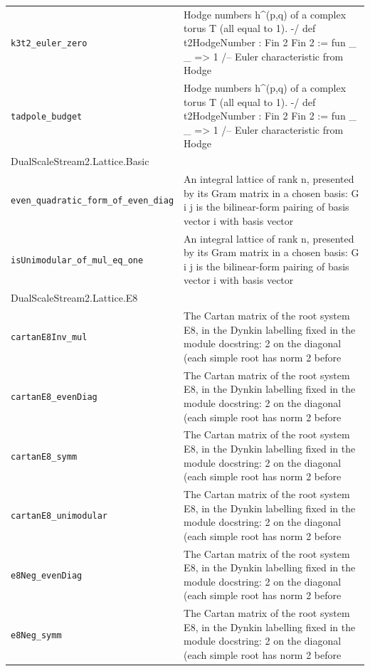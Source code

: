 \begin{longtable}{p{}p{}}
\quad\texttt{\footnotesize k3t2\_euler\_zero} & {\footnotesize Hodge numbers h\^{}(p,q) of a complex torus T (all equal to 1). -/ def t2HodgeNumber : Fin 2  Fin 2   := fun \_ \_ => 1 /-- Euler characteristic from Hodge} \\
\quad\texttt{\footnotesize tadpole\_budget} & {\footnotesize Hodge numbers h\^{}(p,q) of a complex torus T (all equal to 1). -/ def t2HodgeNumber : Fin 2  Fin 2   := fun \_ \_ => 1 /-- Euler characteristic from Hodge} \\
\multicolumn{2}{l}{\textsf{\small DualScaleStream2.Lattice.Basic}} \\
\quad\texttt{\footnotesize even\_quadratic\_form\_of\_even\_diag} & {\footnotesize An integral lattice of rank n, presented by its Gram matrix in a chosen basis: G i j is the bilinear-form pairing of basis vector i with basis vector } \\
\quad\texttt{\footnotesize isUnimodular\_of\_mul\_eq\_one} & {\footnotesize An integral lattice of rank n, presented by its Gram matrix in a chosen basis: G i j is the bilinear-form pairing of basis vector i with basis vector } \\
\multicolumn{2}{l}{\textsf{\small DualScaleStream2.Lattice.E8}} \\
\quad\texttt{\footnotesize cartanE8Inv\_mul} & {\footnotesize The Cartan matrix of the root system E8, in the Dynkin labelling fixed in the module docstring: 2 on the diagonal (each simple root has norm 2 before } \\
\quad\texttt{\footnotesize cartanE8\_evenDiag} & {\footnotesize The Cartan matrix of the root system E8, in the Dynkin labelling fixed in the module docstring: 2 on the diagonal (each simple root has norm 2 before } \\
\quad\texttt{\footnotesize cartanE8\_symm} & {\footnotesize The Cartan matrix of the root system E8, in the Dynkin labelling fixed in the module docstring: 2 on the diagonal (each simple root has norm 2 before } \\
\quad\texttt{\footnotesize cartanE8\_unimodular} & {\footnotesize The Cartan matrix of the root system E8, in the Dynkin labelling fixed in the module docstring: 2 on the diagonal (each simple root has norm 2 before } \\
\quad\texttt{\footnotesize e8Neg\_evenDiag} & {\footnotesize The Cartan matrix of the root system E8, in the Dynkin labelling fixed in the module docstring: 2 on the diagonal (each simple root has norm 2 before } \\
\quad\texttt{\footnotesize e8Neg\_symm} & {\footnotesize The Cartan matrix of the root system E8, in the Dynkin labelling fixed in the module docstring: 2 on the diagonal (each simple root has norm 2 before } \\

\end{longtable}
